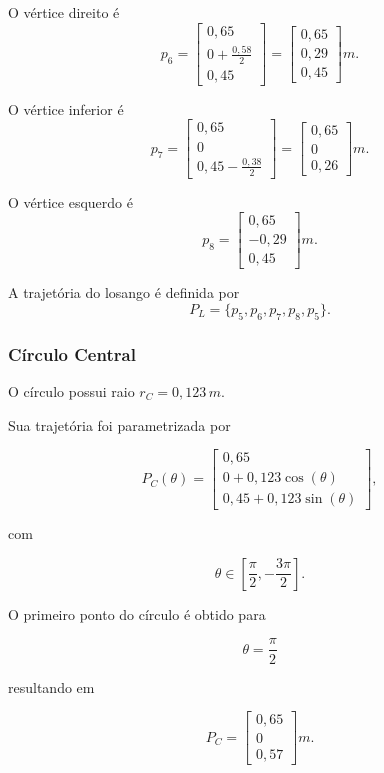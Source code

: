 O vértice direito é
\[
p_6=
\begin{bmatrix}
0,65\\
0+\frac{0,58}{2}\\
0,45
\end{bmatrix}
=
\begin{bmatrix}
0,65\\
0,29\\
0,45
\end{bmatrix}
m.
\]

O vértice inferior é
\[
p_7=
\begin{bmatrix}
0,65\\
0\\
0,45-\frac{0,38}{2}
\end{bmatrix}
=
\begin{bmatrix}
0,65\\
0\\
0,26
\end{bmatrix}
m.
\]

O vértice esquerdo é
\[
p_8=
\begin{bmatrix}
0,65\\
-0,29\\
0,45
\end{bmatrix}
m.
\]

A trajetória do losango é definida por
\[
P_L=
\{p_5,p_6,p_7,p_8,p_5\}.
\]

\subsubsection{Círculo Central}

O círculo possui raio $r_C=0,123\,m$.
\par Sua trajetória foi parametrizada por

\[
P_C(\theta)=
\begin{bmatrix}
0,65\\
0+0,123\cos(\theta)\\
0,45+0,123\sin(\theta)
\end{bmatrix},
\]

com

\[
\theta
\in
\left[
\frac{\pi}{2},
-\frac{3\pi}{2}
\right].
\]

O primeiro ponto do círculo é obtido para

\[
\theta=\frac{\pi}{2}
\]

resultando em

\[
P_C
=
\begin{bmatrix}
0,65\\
0\\
0,57
\end{bmatrix}
m.
\]

